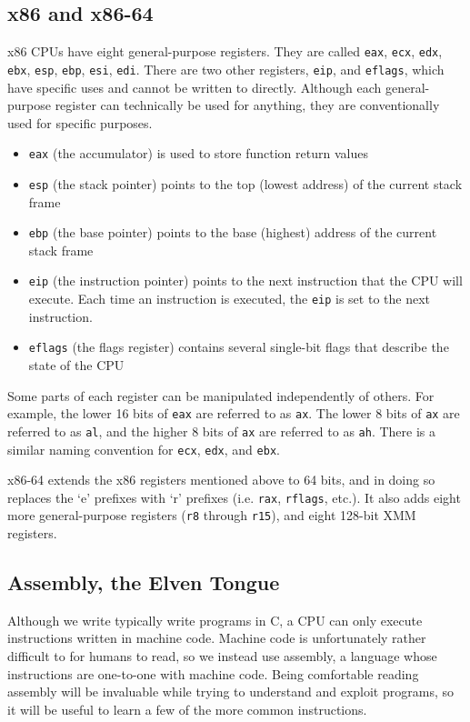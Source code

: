 \subsection{x86 and x86-64}
x86 CPUs have eight general-purpose registers. They are called \texttt{eax},
\texttt{ecx}, \texttt{edx}, \texttt{ebx}, \texttt{esp}, \texttt{ebp},
\texttt{esi}, \texttt{edi}. There are two other registers, \texttt{eip}, and
\texttt{eflags}, which have specific uses and cannot be written to directly.
Although each general-purpose register can technically be used for anything,
they are conventionally used for specific purposes.

\begin{itemize}
    \item \texttt{eax} (the accumulator) is used to store function return values 
    \item \texttt{esp} (the stack pointer) points to the top (lowest address) of
        the current stack frame 
    \item \texttt{ebp} (the base pointer) points to the base (highest) address
        of the current stack frame 
    \item \texttt{eip} (the instruction pointer) points to the next instruction
        that the CPU will execute. Each time an instruction is executed, the
        \texttt{eip} is set to the next instruction.
    \item \texttt{eflags} (the flags register) contains several single-bit flags
        that describe the state of the CPU
\end{itemize}

Some parts of each register can be manipulated independently of others. For
example, the lower 16 bits of \texttt{eax} are referred to as \texttt{ax}. The
lower 8 bits of \texttt{ax} are referred to as \texttt{al}, and the higher 8
bits of \texttt{ax} are referred to as \texttt{ah}. There is a similar naming
convention for \texttt{ecx}, \texttt{edx}, and \texttt{ebx}.

x86-64 extends the x86 registers mentioned above to 64 bits, and in doing so
replaces the `e' prefixes with `r' prefixes (i.e. \texttt{rax}, \texttt{rflags},
etc.). It also adds eight more general-purpose registers (\texttt{r8} through
\texttt{r15}), and eight 128-bit XMM registers.

\subsection{Assembly, the Elven Tongue}
Although we write typically write programs in C, a CPU can only execute
instructions written in machine code. Machine code is unfortunately rather
difficult to for humans to read, so we instead use assembly, a language whose
instructions are one-to-one with machine code. Being comfortable reading
assembly will be invaluable while trying to understand and exploit programs, so
it will be useful to learn a few of the more common instructions.

